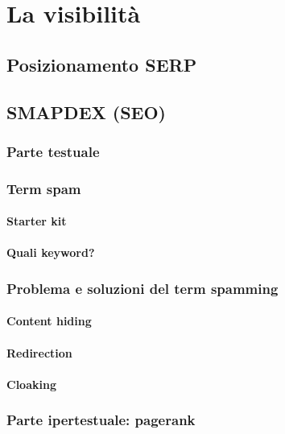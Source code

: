 
\chapter{La visibilità}

	\section{Posizionamento SERP}	
	
	\section{SMAPDEX (SEO)}
		
		\subsection{Parte testuale}
			
		\subsection{Term spam}
		
			\subsubsection{Starter kit}
		
			\subsubsection{Quali keyword?}
			
		\subsection{Problema e soluzioni del term spamming}
		
			\subsubsection{Content hiding}
			
			\subsubsection{Redirection}
			
			\subsubsection{Cloaking}
	
		\subsection{Parte ipertestuale: pagerank}
		
